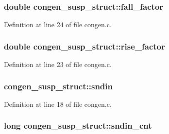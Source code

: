 \subsubsection[{\texorpdfstring{fall\+\_\+factor}{fall_factor}}]{\setlength{\rightskip}{0pt plus 5cm}double congen\+\_\+susp\+\_\+struct\+::fall\+\_\+factor}\hypertarget{structcongen__susp__struct_adbf4aa6a367202a8ab6aa1a9c131e64d}{}\label{structcongen__susp__struct_adbf4aa6a367202a8ab6aa1a9c131e64d}


Definition at line 24 of file congen.\+c.

\subsubsection[{\texorpdfstring{rise\+\_\+factor}{rise_factor}}]{\setlength{\rightskip}{0pt plus 5cm}double congen\+\_\+susp\+\_\+struct\+::rise\+\_\+factor}\hypertarget{structcongen__susp__struct_a383e756dc161fc7ce8fac66bae34ee4c}{}\label{structcongen__susp__struct_a383e756dc161fc7ce8fac66bae34ee4c}


Definition at line 23 of file congen.\+c.

\subsubsection[{\texorpdfstring{sndin}{sndin}}]{ congen\+\_\+susp\+\_\+struct\+::sndin}\hypertarget{structcongen__susp__struct_ad8e9b41cb4564279660b1e9a0158302e}{}\label{structcongen__susp__struct_ad8e9b41cb4564279660b1e9a0158302e}


Definition at line 18 of file congen.\+c.

\subsubsection[{\texorpdfstring{sndin\+\_\+cnt}{sndin_cnt}}]{\setlength{\rightskip}{0pt plus 5cm}long congen\+\_\+susp\+\_\+struct\+::sndin\+\_\+cnt}\hypertarget{structcongen__susp__struct_a3d70594810a32a1853aedff21ff5da29}{}\label{structcongen__susp__struct_a3d70594810a32a1853aedff21ff5da29}


